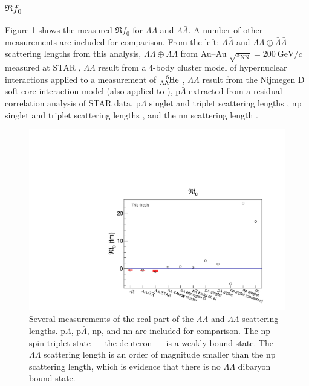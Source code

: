 


\subsubsection{$\Re f_0$}
\label{sec:Ref0Result}


Figure \ref{fig:Ref0} shows the measured $\Re f_0$ for $\Lambda\Lambda$ and $\Lambda\bar{\Lambda}$. A number of other measurements are included for comparison. From the left: $\Lambda\bar{\Lambda}$ and $\Lambda\Lambda \oplus \bar{\Lambda}\bar{\Lambda}$ scattering lengths from this analysis, $\Lambda\Lambda \oplus \bar{\Lambda}\bar{\Lambda}$ from Au--Au $\sqrt{s_{\mathrm{NN}}} = 200\ \mathrm{GeV}/c$ measured at STAR \cite{Adamczyk:2014vca}, $\Lambda\Lambda$ result from a 4-body cluster model of hypernuclear interactions \cite{Hiyama:2002yj} applied to a measurement of $\ce{^{6}_{\Lambda\Lambda}\mathrm{He}}$ \cite{Takahashi:2001nm}, $\Lambda\Lambda$ result from the Nijmegen D soft-core interaction model \cite{Filikhin:2002wm} (also applied to \cite{Hiyama:2002yj}), $\mathrm{p}\bar{\Lambda}$ extracted from a residual correlation analysis \cite{Kisiel:2014mma} of STAR data, $\mathrm{p}\Lambda$ singlet and triplet scattering lengths \cite{Wang:1999bf}, np singlet and triplet scattering lengths \cite{LANDAU1977502}, and the nn scattering length \cite{vonWitsch:1979uni}.

\begin{figure}[hbtp]
\includegraphics[width=36pc]{Figures/FitResults/2016-10-12-Ref0.pdf}
\caption[Measurements of $\Re f_0$ for various particle pairs]{Several measurements of the real part of the $\Lambda\Lambda$ and $\Lambda\bar{\Lambda}$ scattering lengths. p$\Lambda$, p$\bar{\Lambda}$, np, and nn are included for comparison. The np spin-triplet state --- the deuteron --- is a weakly bound state. The $\Lambda\Lambda$ scattering length is an order of magnitude smaller than the np scattering length, which is evidence that there is no $\Lambda\Lambda$ dibaryon bound state.}
\label{fig:Ref0}
\end{figure}

